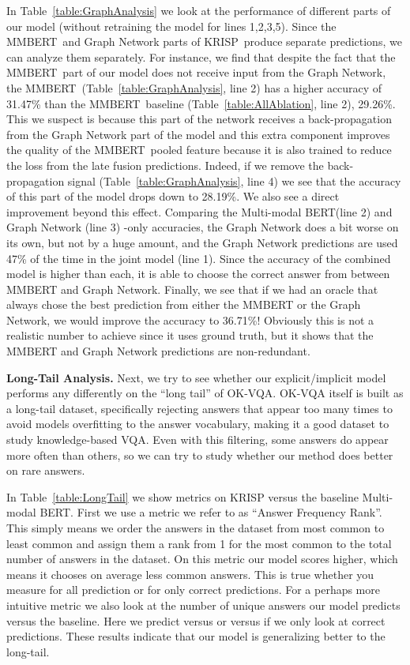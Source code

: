\documentclass[final]{cvpr}
\providecommand{\ModelName}{KRISP\xspace}
\providecommand{\MMBERTBase}{Multi-modal BERT\xspace}
\providecommand{\MMBERTAbr}{MMBERT\xspace}
\providecommand{\myparagraph}[1]{\noindent\textbf{#1.}}
\providecommand{\sectionvspace}{\vspace{-0cm}}
\begin{document}
In Table~\ref{table:GraphAnalysis} we look at the performance of different parts of our model (without retraining the model for lines 1,2,3,5). Since the \MMBERTAbr~and Graph Network parts of \ModelName~produce separate predictions, we can analyze them separately. 
For instance, we find that despite the fact that the \MMBERTAbr~part of our model does not receive input from the Graph Network, the \MMBERTAbr~(Table~\ref{table:GraphAnalysis}, line 2) has a higher accuracy of 31.47\% than the \MMBERTAbr~baseline (Table~\ref{table:AllAblation}, line 2), 29.26\%. This we suspect is because this part of the network receives a back-propagation from the Graph Network part of the model and this extra component improves the quality of the \MMBERTAbr~pooled feature because it is also trained to reduce the loss from the late fusion predictions. Indeed, if we remove the back-propagation signal  
(Table~\ref{table:GraphAnalysis}, line 4) we see that the accuracy of this part of the model drops down to 28.19\%. We also see a direct improvement beyond this effect. Comparing the \MMBERTBase (line 2) and Graph Network (line 3) -only accuracies, the Graph Network does a bit worse on its own, but not by a huge amount, and the Graph Network predictions are used 47\% of the time in the joint model (line 1). Since the accuracy of the combined model is higher than each, it is able to choose the correct answer from between \MMBERTAbr and Graph Network. Finally, we see that if we had an oracle that always chose the best prediction from either the \MMBERTAbr or the Graph Network, we would improve the accuracy to 36.71\%! Obviously this is not a realistic number to achieve since it uses ground truth, but it shows that the \MMBERTAbr and Graph Network predictions are non-redundant.

\myparagraph{Long-Tail Analysis}
Next, we try to see whether our explicit/implicit model performs any differently on the ``long tail'' of OK-VQA. OK-VQA itself is built as a long-tail dataset, specifically rejecting answers that appear too many times to avoid models overfitting to the answer vocabulary, making it a good dataset to study knowledge-based VQA. Even with this filtering, some answers do appear more often than others, so we can try to study whether our method does better on rare answers. 

In Table~\ref{table:LongTail} we show metrics on \ModelName versus the baseline \MMBERTBase. First we use a metric we refer to as ``Answer Frequency Rank''. This simply means we order the answers in the dataset from most common to least common 
and assign them a rank from 1 for the most common to the total number of answers in the dataset. On this metric our model 
scores higher, which means it chooses on average less common answers. This is true whether you measure for all prediction or for only correct predictions.
For a perhaps more intuitive metric we also look at the number of unique answers our model predicts versus the baseline. Here we predict  versus  or  versus  if we only look at correct predictions.
These results indicate that our model is generalizing better to the long-tail.
\sectionvspace
\end{document}
